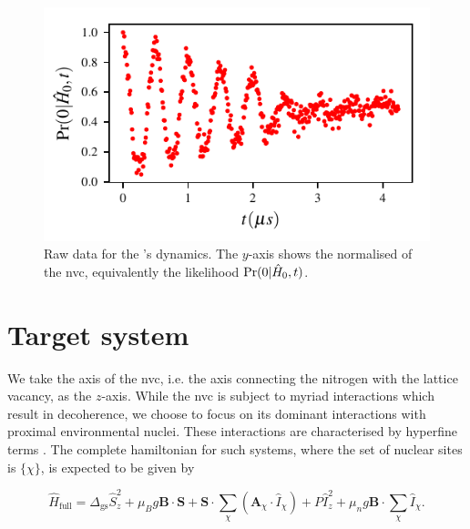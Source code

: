 \begin{figure}[t]
    \begin{center}
        \includegraphics{experimental_study/figures/raw_data.pdf}
    \end{center}
    \caption[Raw data for nitrogen-vacancy centre's dynamics]{
        Raw data for the 's dynamics.
        The $y$-axis shows the normalised  of the \gls{nvc}, 
        equivalently the \gls{likelihood} $\Pr(0 | \hat{H}_0, t)$. 
    }
    \label{fig:nv_raw_data}
\end{figure}

\newpage
\section{Target system}\label{sec:target_system}
We take the axis of the \gls{nvc}, i.e. the axis connecting the \gls{nitrogen} with the 
    lattice vacancy, as the $z$-axis.
While the \gls{nvc} is subject to myriad interactions which result in decoherence,
    we choose to focus on its dominant interactions with proximal environmental nuclei. 
These interactions are characterised by hyperfine terms \cite{smeltzer201113c}.
The complete \gls{hamiltonian} for such systems, where the set of nuclear sites is $\{\chi\}$,
    is expected to be given by 

\begin{equation}
    \label{eqn:nv_ham_full}
    \hat{H}_{\mathrm{\textrm{full}}} 
    = 
    \Delta_{\textrm{gs}} \hat{S}_z^2 
    + \mu_B g \mathbf{B} \cdot \mathbf{S} 
    + \mathbf{S} \cdot \sum_{\chi} \left( \mathbf{A}_{\chi} \cdot \hat{I}_{\chi} \right) 
    + P \hat{I}_z^2 
    + \mu_n g \mathbf{B} \cdot \sum_{ \chi} \hat{I}_{\chi}.
\end{equation}

